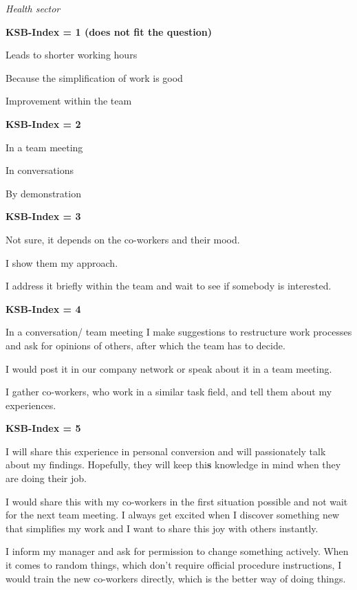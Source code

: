 \documentclass{article}
\begin{document}
\emph{Health sector}

\textbf{KSB-Index = 1 (does not fit the question)}

Leads to shorter working hours

Because the simplification of work is good

Improvement within the team 

\textbf{KSB-Index = 2}

In a team meeting

In conversations 

By demonstration 

\textbf{KSB-Index = 3}

Not sure, it depends on the co-workers and their mood.

I show them my approach. 

I address it briefly within the team and wait to see if somebody is interested. 

\textbf{KSB-Index = 4}

In a conversation/ team meeting I make suggestions to restructure work processes and ask for opinions of others, after which the team has to decide.

I would post it in our company network or speak about it in a team meeting. 

I gather co-workers, who work in a similar task field, and tell them about my experiences. 

\textbf{KSB-Index = 5}

I will share this experience in personal conversion and will passionately talk about my findings. Hopefully, they will keep thi\textbf{s }knowledge in mind when they are doing their job. 

I would share this with my co-workers in the first situation possible and not wait for the next team meeting. I always get excited when I discover something new that simplifies my work and I want to share this joy with others instantly. 

I inform my manager and ask for permission to change something actively. When it comes to random things, which don't require official procedure instructions, I would train the new co-workers directly, which is the better way of doing things.
\end{document}
